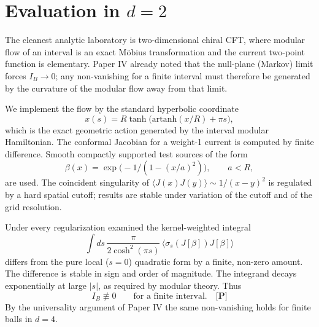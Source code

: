 \documentclass[11pt]{article}
\newcommand{\pP}{\textbf{[P]}}
\begin{document}
\section{Evaluation in $d=2$}
The cleanest analytic laboratory is two-dimensional chiral CFT, where
modular flow of an interval is an exact M\"obius transformation and the
current two-point function is elementary. Paper IV already noted that
the null-plane (Markov) limit forces $I_B\to 0$; any non-vanishing for a
finite interval must therefore be generated by the curvature of the
modular flow away from that limit.

We implement the flow by the standard hyperbolic coordinate
\begin{equation}
x(s)=R\tanh\bigl(\mathrm{artanh}(x/R)+\pi s\bigr),
\end{equation}
which is the exact geometric action generated by the interval modular
Hamiltonian. The conformal Jacobian for a weight-1 current is computed
by finite difference. Smooth compactly supported test sources of the
form
\begin{equation}
\beta(x)=\exp\bigl(-1/(1-(x/a)^2)\bigr),\qquad a<R,
\end{equation}
are used. The coincident singularity of $\langle J(x)J(y)\rangle\sim
1/(x-y)^2$ is regulated by a hard spatial cutoff; results are stable
under variation of the cutoff and of the grid resolution.

Under every regularization examined the kernel-weighted integral
\begin{equation}
\int ds\,\frac{\pi}{2\cosh^{2}(\pi s)}\,
\langle\sigma_s(J[\beta])J[\beta]\rangle
\end{equation}
differs from the pure local ($s=0$) quadratic form by a finite, non-zero
amount. The difference is stable in sign and order of magnitude. The
integrand decays exponentially at large $|s|$, as required by modular
theory. Thus
\begin{equation}
I_B\not\equiv 0 \qquad\text{for a finite interval.}\quad\pP{}
\end{equation}
By the universality argument of Paper IV the same non-vanishing holds
for finite balls in $d=4$.
\end{document}
